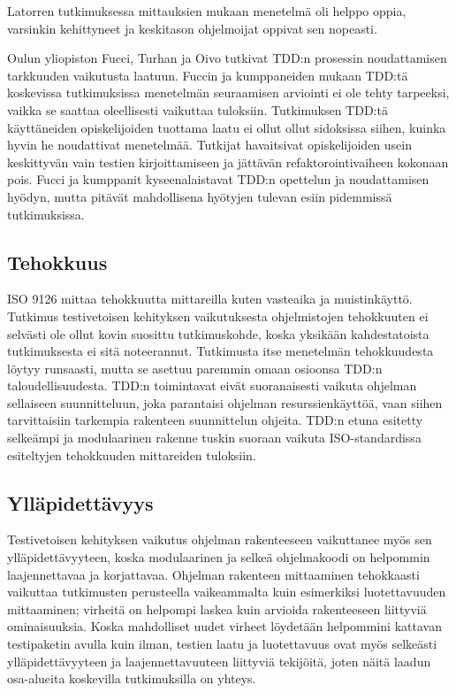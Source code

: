 \documentclass[finnish]{tktltiki2}
\theoremstyle{definition}
\theoremstyle{remark}
\begin{document}
Latorren \cite{Latorre14} tutkimuksessa mittauksien mukaan menetelmä oli helppo oppia, varsinkin kehittyneet ja keskitason ohjelmoijat oppivat sen nopeasti.

Oulun yliopiston Fucci, Turhan ja Oivo \cite{Fucci14} tutkivat TDD:n prosessin noudattamisen tarkkuuden vaikutusta laatuun. Fuccin ja kumppaneiden mukaan TDD:tä koskevissa tutkimuksissa menetelmän seuraamisen arviointi ei ole tehty tarpeeksi, vaikka se saattaa oleellisesti vaikuttaa tuloksiin. Tutkimuksen TDD:tä käyttäneiden opiskelijoiden tuottama laatu ei ollut ollut sidoksissa siihen, kuinka hyvin he noudattivat menetelmää. Tutkijat havaitsivat opiskelijoiden usein keskittyvän vain testien kirjoittamiseen ja jättävän refaktorointivaiheen kokonaan pois. Fucci ja kumppanit kyseenalaistavat TDD:n opettelun ja noudattamisen hyödyn, mutta pitävät mahdollisena hyötyjen tulevan esiin pidemmissä tutkimuksissa.

\subsection{Tehokkuus}

ISO 9126 mittaa tehokkuutta mittareilla kuten vasteaika ja muistinkäyttö. Tutkimus testivetoisen kehityksen vaikutuksesta ohjelmistojen tehokkuuten ei selvästi ole ollut kovin suosittu tutkimuskohde, koska yksikään kahdestatoista tutkimuksesta ei sitä noteerannut. Tutkimusta itse menetelmän tehokkuudesta löytyy runsaasti, mutta se asettuu paremmin omaan osioonsa TDD:n taloudellisuudesta. TDD:n toimintavat eivät suoranaisesti vaikuta ohjelman sellaiseen suunnitteluun, joka parantaisi ohjelman resurssienkäyttöä, vaan siihen tarvittaisiin tarkempia rakenteen suunnittelun ohjeita. TDD:n etuna esitetty selkeämpi ja modulaarinen rakenne tuskin suoraan vaikuta ISO-standardissa esiteltyjen tehokkuuden mittareiden tuloksiin.

\subsection{Ylläpidettävyys}

Testivetoisen kehityksen vaikutus ohjelman rakenteeseen vaikuttanee myös sen ylläpidettävyyteen, koska modulaarinen ja selkeä ohjelmakoodi on helpommin laajennettavaa ja korjattavaa. Ohjelman rakenteen mittaaminen tehokkaasti vaikuttaa tutkimusten perusteella vaikeammalta kuin esimerkiksi luotettavuuden mittaaminen; virheitä on helpompi laskea kuin arvioida rakenteeseen liittyviä ominaisuuksia. Koska mahdolliset uudet virheet löydetään helpommini kattavan testipaketin avulla kuin ilman, testien laatu ja luotettavuus ovat myös selkeästi ylläpidettävyyteen ja laajennettavuuteen liittyviä tekijöitä, joten näitä laadun osa-alueita koskevilla tutkimuksilla on yhteys.
\end{document}
